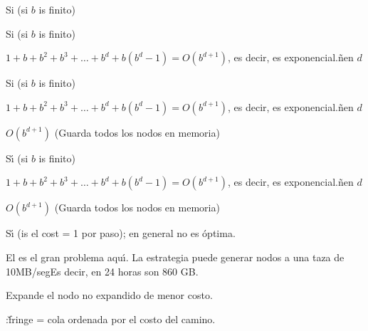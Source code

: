 \documentclass{article}
\begin{document}
\begin{huge}



 Si (si $b$ is finito)



 Si (si $b$ is finito)

 $1+b+b^2+b^3+\ldots +b^d + b(b^d-1)= O(b^{d+1})$, es
decir, es exponencial.{\~n}en $d$



 Si (si $b$ is finito)

 $1+b+b^2+b^3+\ldots +b^d + b(b^d-1)= O(b^{d+1})$, es
decir, es exponencial.{\~n}en $d$

 $O(b^{d+1})$ (Guarda todos los nodos en memoria)



 S{\'\i} (si $b$ is finito)

 $1+b+b^2+b^3+\ldots +b^d + b(b^d-1)= O(b^{d+1})$, es
decir, es exponencial.{\~n}en $d$

 $O(b^{d+1})$ (Guarda todos los nodos en memoria)

 S{\'\i} (is el cost = 1 por paso); en general no
es {\'o}ptima.

El  es el gran problema aqu{\'\i}. La estrategia
puede generar nodos a una taza de 10MB/seg\nl Es decir, en 24
horas son 860 GB.



Expande el nodo no expandido de menor costo.

:\nl \v{fringe} = cola ordenada por el
costo del camino.


\end{huge}
\end{document}
